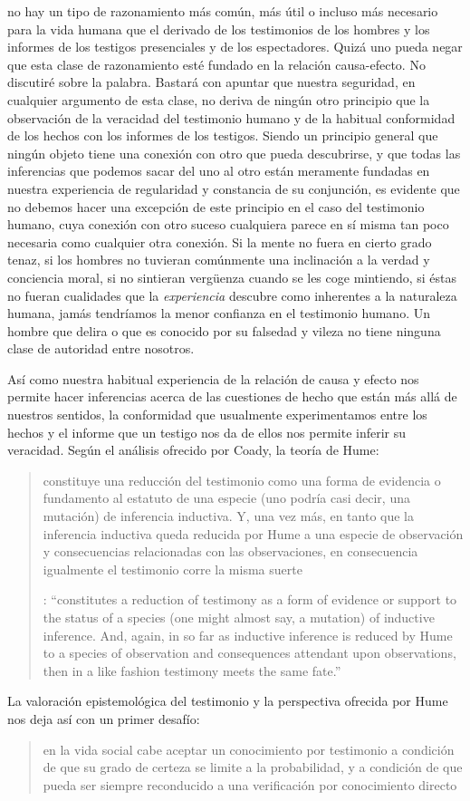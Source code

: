 {no hay un tipo de razonamiento más común, más útil o incluso más necesario para la vida humana que el derivado de los testimonios de los hombres y los informes de los testigos presenciales y de los espectadores. Quizá uno pueda negar que esta clase de razonamiento esté fundado en la relación causa-efecto. No discutiré sobre la palabra. Bastará con apuntar que nuestra seguridad, en cualquier argumento de esta clase, no deriva de ningún otro principio que la observación de la veracidad del testimonio humano y de la habitual conformidad de los hechos con los informes de los testigos. Siendo un principio general que ningún objeto tiene una conexión con otro que pueda descubrirse, y que todas las inferencias que podemos sacar del uno al otro están meramente fundadas en nuestra experiencia de regularidad y constancia de su conjunción, es evidente que no debemos hacer una excepción de este principio en el caso del testimonio humano, cuya conexión con otro suceso cualquiera parece en sí misma tan poco necesaria como cualquier otra conexión. Si la mente no fuera en cierto grado tenaz, si los hombres no tuvieran comúnmente una inclinación a la verdad y conciencia moral, si no sintieran vergüenza cuando se les coge mintiendo, si éstas no fueran cualidades que la \emph{experiencia} descubre como inherentes a la naturaleza humana, jamás tendríamos la menor confianza en el testimonio humano. Un hombre que delira o que es conocido por su falsedad y vileza no tiene ninguna clase de autoridad entre nosotros}.

Así como nuestra habitual experiencia de la relación de causa y efecto nos permite hacer inferencias acerca de las cuestiones de hecho que están más allá de nuestros sentidos, la conformidad que usualmente experimentamos entre los hechos y el informe que un testigo nos da de ellos nos permite inferir su veracidad. Según el análisis ofrecido por Coady, la teoría de Hume: \blockquote[{\cite[79]{coady1992test}}: \enquote{constitutes a reduction of testimony as a form of evidence or support to the status of a species (one might almost say, a mutation) of inductive inference. And, again, in so far as inductive inference is reduced by Hume to a species of observation and consequences attendant upon observations, then in a like fashion testimony meets the same fate.}]{constituye una reducción del testimonio como una forma de evidencia o fundamento al estatuto de una especie (uno podría casi decir, una mutación) de inferencia inductiva. Y, una vez más, en tanto que la inferencia inductiva queda reducida por Hume a una especie de observación y consecuencias relacionadas con las observaciones, en consecuencia igualmente el testimonio corre la misma suerte} La valoración epistemológica del testimonio y la perspectiva ofrecida por Hume nos deja así con un primer desafío: \blockquote[{\cite[294]{prades2015testimonio}}]{en la vida social cabe aceptar un conocimiento por testimonio a condición de que su grado de certeza se limite a la probabilidad, y a condición de que pueda ser siempre reconducido a una verificación por conocimiento directo}.

